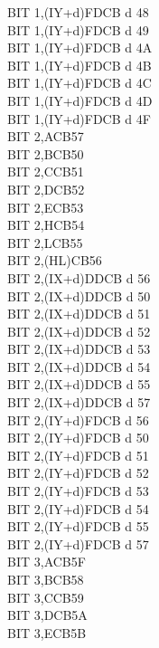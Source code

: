 \begin{multicols}{3}
{\begin{tabbing}
        BIT 1,(IY+d)\UNDOC\>FDCB d 48\\
        BIT 1,(IY+d)\UNDOC\>FDCB d 49\\
        BIT 1,(IY+d)\UNDOC\>FDCB d 4A\\
        BIT 1,(IY+d)\UNDOC\>FDCB d 4B\\
        BIT 1,(IY+d)\UNDOC\>FDCB d 4C\\
        BIT 1,(IY+d)\UNDOC\>FDCB d 4D\\
        BIT 1,(IY+d)\UNDOC\>FDCB d 4F\\
        BIT 2,A\>CB57\\
        BIT 2,B\>CB50\\
        BIT 2,C\>CB51\\
        BIT 2,D\>CB52\\
        BIT 2,E\>CB53\\
        BIT 2,H\>CB54\\
        BIT 2,L\>CB55\\
        BIT 2,(HL)\>CB56\\
        BIT 2,(IX+d)\>DDCB d 56\\
        BIT 2,(IX+d)\UNDOC\>DDCB d 50\\
        BIT 2,(IX+d)\UNDOC\>DDCB d 51\\
        BIT 2,(IX+d)\UNDOC\>DDCB d 52\\
        BIT 2,(IX+d)\UNDOC\>DDCB d 53\\
        BIT 2,(IX+d)\UNDOC\>DDCB d 54\\
        BIT 2,(IX+d)\UNDOC\>DDCB d 55\\
        BIT 2,(IX+d)\UNDOC\>DDCB d 57\\
        BIT 2,(IY+d)\>FDCB d 56\\
        BIT 2,(IY+d)\UNDOC\>FDCB d 50\\
        BIT 2,(IY+d)\UNDOC\>FDCB d 51\\
        BIT 2,(IY+d)\UNDOC\>FDCB d 52\\
        BIT 2,(IY+d)\UNDOC\>FDCB d 53\\
        BIT 2,(IY+d)\UNDOC\>FDCB d 54\\
        BIT 2,(IY+d)\UNDOC\>FDCB d 55\\
        BIT 2,(IY+d)\UNDOC\>FDCB d 57\\
        BIT 3,A\>CB5F\\
        BIT 3,B\>CB58\\
        BIT 3,C\>CB59\\
        BIT 3,D\>CB5A\\
        BIT 3,E\>CB5B\\

\end{tabbing}}
\end{multicols}
